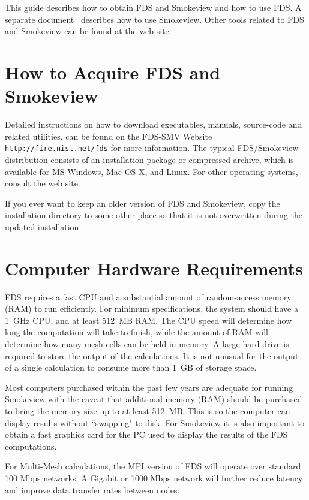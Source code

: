 \documentclass[11pt]{book}
\newcommand{\ct}{\tt\small}
\begin{document}
This guide describes how to obtain FDS and Smokeview and how to use FDS.
A separate document~\cite{Smokeview_Users_Guide_5} describes how to use Smokeview. Other tools related to
FDS and Smokeview can be found at the web site.

\section{How to Acquire FDS and Smokeview}
\label{info:sfcvs}
Detailed instructions on how to download executables, manuals, source-code and related utilities,
can be found on the FDS-SMV Website
\href{http://fire.nist.gov/fds}{{\ct http://fire.nist.net/fds}} for more information.
The typical FDS/Smokeview distribution consists of an installation package or compressed archive, which is available for MS Windows, Mac OS X, and Linux.  For other operating systems, consult the web site.

\begin{warning}
\noindent
If you ever want to keep an older version of FDS and Smokeview, copy the installation directory to some other
place so that it is not overwritten during the updated installation.
\end{warning}

\section{Computer Hardware Requirements}
FDS requires a fast CPU and a substantial amount of random-access memory (RAM) to run efficiently.
For minimum specifications, the system should have a 1~GHz CPU, and at least 512~MB RAM.
The CPU speed will determine how long the computation will take to finish, while the amount
of RAM will determine how many mesh cells can be held in memory.
A large hard drive is required to store the output of the calculations. It is not unusual for
the output of a single calculation to consume more than 1~GB of storage space.

Most computers purchased within the past few years are adequate for running Smokeview
with the caveat that additional memory (RAM) should be purchased to bring the
memory size up to at least 512~MB. This is so the computer can display results without
``swapping" to disk. For Smokeview it is also important to obtain a fast graphics card
for the PC used to display the results of the FDS computations.

For Multi-Mesh calculations, the MPI version of FDS will operate over standard 100 Mbps networks.
A Gigabit or 1000 Mbps network will further reduce latency and improve data transfer rates between nodes.
\end{document}
